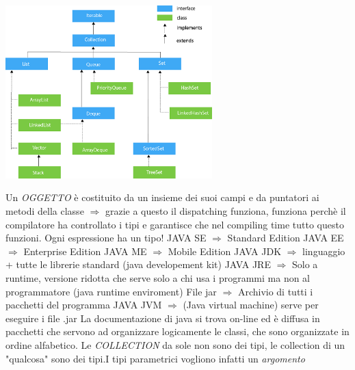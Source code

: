 \begin{center}
\includegraphics[width=%
0.6\textwidth]{java-collection-hierarchy}
\end{center} 

Un \textit{OGGETTO} è costituito da un insieme dei suoi campi e da puntatori ai metodi della classe $\Rightarrow$ grazie a questo il dispatching funziona, funziona perchè il compilatore ha controllato i tipi e garantisce che nel compiling time tutto questo funzioni. \newline
Ogni espressione ha un tipo!
\newline
JAVA SE $\Rightarrow$ Standard Edition \newline
JAVA EE $\Rightarrow$ Enterprise Edition \newline
JAVA ME $\Rightarrow$ Mobile Edition \newline
JAVA JDK $\Rightarrow$ linguaggio + tutte le librerie standard (java developement kit) \newline
JAVA JRE $\Rightarrow$ Solo a runtime, versione ridotta che serve solo a chi usa i programmi ma non al programmatore (java runtime enviroment) \newline
File jar  $\Rightarrow$ Archivio di tutti i pacchetti del programma \newline
JAVA JVM $\Rightarrow$ (Java virtual machine) serve per eseguire i file .jar \newline
La documentazione di java si trova on-line ed è diffusa in pacchetti che servono ad organizzare logicamente le classi, che sono organizzate in ordine alfabetico. \newline
Le \textit{COLLECTION} da sole non sono dei tipi, le collection di un "qualcosa" sono dei tipi.I tipi parametrici vogliono infatti un \textit{argomento}




\newpage











